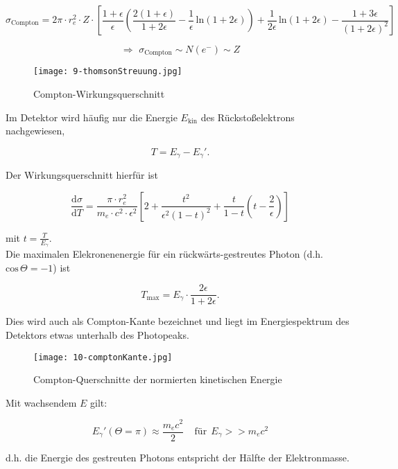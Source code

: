 \[\sigma_{\text{Compton}} = 2\pi \cdot r_e^2\cdot Z \cdot
\left[\frac{1+\epsilon}{\epsilon}\left( \frac{2(1+\epsilon)}{1+2\epsilon} -
\frac{1}{\epsilon}\,\text{ln}(1+2\epsilon) \right) + \frac{1}{2\epsilon}\,\text{ln}(1+2\epsilon) -
\frac{1+3\epsilon}{(1+2\epsilon)^2} \right] \]

\[\Rightarrow\,\, \sigma_{\text{Compton}} \sim N(e^-) \sim Z  \]

\begin{figure}[H]
	\centering
	\texttt{[image: 9-thomsonStreuung.jpg]}
	\caption{Compton-Wirkungsquerschnitt}
	\label{comptonwq}
\end{figure}

Im Detektor wird häufig nur die Energie $E_{\text{kin}}$ des Rückstoßelektrons nachgewiesen,

\[T= E_\gamma -E_\gamma'.  \]

Der Wirkungsquerschnitt hierfür ist

\[\frac{\mathrm{d}\sigma}{\mathrm{d}T} = \frac{\pi\cdot r_e^2}{m_e\cdot c^2\cdot \epsilon^2} \left[
2+ \frac{t^2}{\epsilon^2(1-t)^2} +\frac{t}{1-t}\left(t-\frac{2}{\epsilon} \right) \right] \]

mit $t=\frac{T}{E_\gamma}$.
\\
Die maximalen Elekronenenergie für ein rückwärts-gestreutes Photon (d.h. $\text{cos}\,\Theta=-1$)
ist

\[T_{\text{max}} = E_\gamma\cdot \frac{2\epsilon}{1+2\epsilon}. \] 

Dies wird auch als Compton-Kante bezeichnet und liegt im Energiespektrum des Detektors etwas
unterhalb des Photopeaks.

\begin{figure}[H]
	\centering
	\texttt{[image: 10-comptonKante.jpg]}
	\caption{Compton-Querschnitte der normierten kinetischen Energie}
	\label{comptonTmax}
\end{figure}

Mit wachsendem $E$ gilt:

\[E_\gamma'(\Theta=\pi) \approx \frac{m_ec^2}{2}~~~~~\text{für}~~E_\gamma>>m_ec^2  \]

d.h. die Energie des gestreuten Photons entspricht der Hälfte der Elektronmasse.